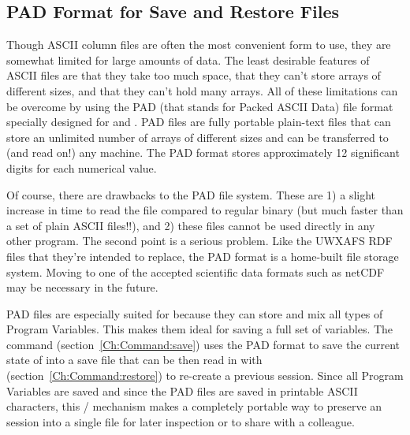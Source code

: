 \subsection{{\ifeffit} PAD Format for Save and Restore Files} \label{Ch:IO-PAD}
{}

Though ASCII column files are often the most convenient form to use, they
are somewhat limited for large amounts of data.  The least desirable
features of ASCII files are that they take too much space, that they can't
store arrays of different sizes, and that they can't hold many arrays.  All
of these limitations can be overcome by using the PAD (that stands for
Packed ASCII Data) file format specially designed for {\feff} and
{\ifeffit}.  PAD files are fully portable plain-text files that can store
an unlimited number of arrays of different sizes and can be transferred to
(and read on!) any machine.  The PAD format stores approximately 12
significant digits for each numerical value.

Of course, there are drawbacks to the PAD file system.  These are 1) a
slight increase in time to read the file compared to regular binary (but
much faster than a set of plain ASCII files!!), and 2) these files cannot
be used directly in any other program.  The second point is a serious
problem.  Like the UWXAFS RDF files that they're intended to replace, the
PAD format is a home-built file storage system.  Moving to one of the
accepted scientific data formats such as netCDF may be necessary in the
future.

PAD files are especially suited for {\ifeffit} because they can store and
mix all types of Program Variables.  This makes them ideal for saving a
full set of {\ifeffit} variables.  The {} command
(section~{\ref{Ch:Command:save}}) uses the PAD format to save the current
state of {\ifeffit} into a save file that can be then read in with
{} (section~{\ref{Ch:Command:restore}}) to re-create a previous
{\ifeffit} session.  Since all Program Variables are saved and since the
PAD files are saved in printable ASCII characters, this
{}/{} mechanism makes a completely portable way to
preserve an {\ifeffit} session into a single file for later inspection or
to share with a colleague.
{ }



